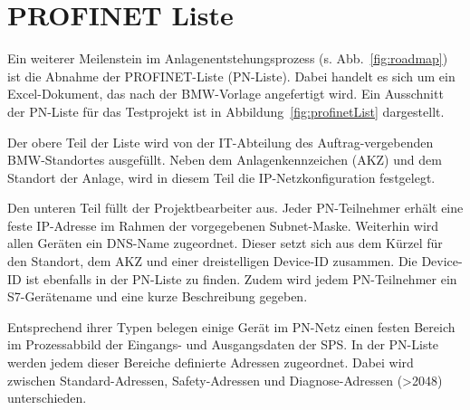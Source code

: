 


\section{PROFINET Liste}
\label{sec:profinetList}



Ein weiterer Meilenstein im Anlagenentstehungsprozess (s. Abb.~\ref{fig:roadmap}) ist die Abnahme der PROFINET-Liste (PN-Liste). Dabei handelt es sich um ein Excel-Dokument, das nach der BMW-Vorlage angefertigt wird. Ein Ausschnitt der PN-Liste für das Testprojekt ist in Abbildung~\ref{fig:profinetList} dargestellt.

Der obere Teil der Liste wird von der IT-Abteilung des Auftrag-vergebenden BMW-Standortes ausgefüllt. Neben dem Anlagenkennzeichen (AKZ) und dem Standort der Anlage, wird in diesem Teil die IP-Netzkonfiguration festgelegt.

Den unteren Teil füllt der Projektbearbeiter aus. Jeder PN-Teilnehmer erhält eine feste IP-Adresse im Rahmen der vorgegebenen Subnet-Maske. Weiterhin wird allen Geräten ein DNS-Name zugeordnet. Dieser setzt sich aus dem Kürzel für den Standort, dem AKZ und einer dreistelligen Device-ID zusammen. Die Device-ID ist ebenfalls in der PN-Liste zu finden. Zudem wird jedem PN-Teilnehmer ein S7-Gerätename und eine kurze Beschreibung gegeben.

Entsprechend ihrer Typen belegen einige Gerät im PN-Netz einen festen Bereich im Prozessabbild der Eingangs- und Ausgangsdaten der SPS. In der PN-Liste werden jedem dieser Bereiche definierte Adressen zugeordnet. Dabei wird zwischen Standard-Adressen, Safety-Adressen und Diagnose-Adressen (>2048) unterschieden.
